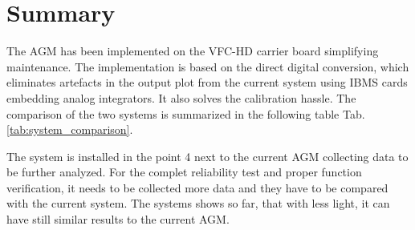 \section{Summary}
The AGM has been implemented on the VFC-HD carrier board simplifying
maintenance. The implementation is based on the direct digital conversion,
which eliminates artefacts in the output plot from the current system using
IBMS cards embedding analog integrators. It also solves the calibration hassle. 
The comparison of the two systems is summarized in the following table Tab.
\ref{tab:system_comparison}.
 
The system is installed in the point 4 next to the current AGM collecting data
to be further analyzed. For the complet reliability test and proper function
verification, it needs to be collected more data and they have to be compared
with the current system. The systems shows so far, that with less light, it can
have still similar results to the current AGM. 





